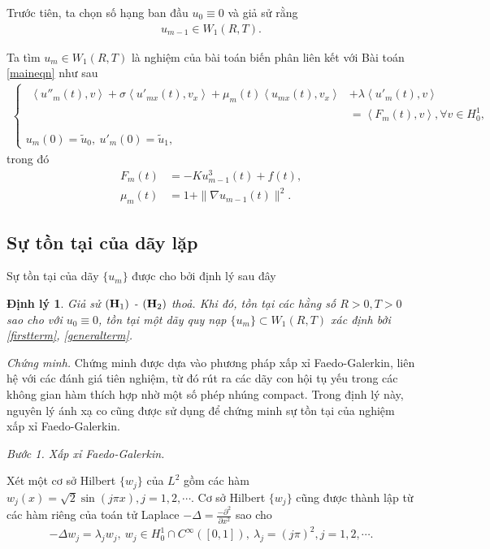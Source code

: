 \documentclass[12pt,a4paper]{article}
\newtheorem{theorem}{Định lý}[section]
\theoremstyle{definition}
\theoremstyle{definition}
\begin{document}
Trước tiên, ta chọn số hạng ban đầu $u_0 \equiv 0$ và giả sử rằng
\begin{align} \label{firstterm}
    u_{m-1} \in W_1(R,T).
\end{align}

Ta tìm $u_m \in W_1(R,T)$ là nghiệm của bài toán biến phân liên kết với Bài toán \eqref{maineqn} như sau
\begin{align} \label{generalterm}
    \begin{cases}
        \begin{aligned}
        \left<u''_m(t), v\right> + \sigma \left<u'_{mx}(t), v_x \right> + \mu_m(t) \left< u_{mx}(t), v_x \right> &+ \lambda \left< u'_m(t), v \right> \\
        &= \left< F_m(t), v \right> , \forall v \in H^1_0, \\
        \end{aligned} \\
        u_m(0) = \tilde{u}_0,\  u'_m(0) = \tilde{u}_1,
    \end{cases}
\end{align}
trong đó
\begin{align*}
    F_m(t) &= -K u^3_{m-1}(t) + f(t), \\
    \mu_m(t) &= 1 + \|\nabla u_{m-1}(t)\|^2.
\end{align*}

\subsection{Sự tồn tại của dãy lặp}

Sự tồn tại của dãy $\{u_m\}$ được cho bởi định lý sau đây

\begin{theorem} \label{theorem31}
    Giả sử $({\bf H}_1)$ - $({\bf H}_2)$ thoả. Khi đó, tồn tại các hằng số $R > 0, T > 0$ sao cho với $u_0 \equiv 0$, tồn tại một dãy quy nạp $\{u_m\} \subset W_1(R,T)$ xác định bởi \eqref{firstterm}, \eqref{generalterm}.
\end{theorem}

\textit{Chứng minh.} Chứng minh được dựa vào phương pháp xấp xỉ Faedo-Galerkin, liên hệ với các đánh giá tiên nghiệm, từ đó rút ra các dãy con hội tụ yếu trong các không gian hàm thích hợp nhờ một số phép nhúng compact. Trong định lý này, nguyên lý ánh xạ co cũng được sử dụng để chứng minh sự tồn tại của nghiệm xấp xỉ Faedo-Galerkin.

\textit{Bước 1. Xấp xỉ Faedo-Galerkin.}

Xét một cơ sở Hilbert $\{w_j\}$ của $L^2$ gồm các hàm $w_j(x) = \sqrt{2} \sin (j\pi x), j = 1,2,\cdots$. Cơ sở Hilbert $\{w_j\}$ cũng được thành lập từ các hàm riêng của toán tử Laplace $-\Delta = \frac{-\partial^2}{\partial x^2}$ sao cho
\begin{align}
    -\Delta w_j = \lambda_j w_j,\  w_j \in H^1_0 \cap C^\infty([0,1]), \  \lambda_j = (j\pi)^2, j = 1,2,\cdots.
\end{align}
\end{document}
